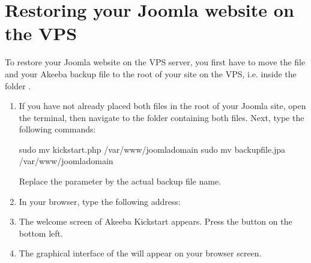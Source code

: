 \documentclass[a4paper,10pt,english,openany,oneside]{sphinxmanual}
\begin{document}
\section{Restoring your Joomla website on the VPS}
\label{\detokenize{joomla-to-vps:restoring-your-joomla-website-on-the-vps}}
\sphinxAtStartPar
To restore your Joomla website on the VPS server, you first have to move the file  and your Akeeba backup file  to the root of your site on the VPS, i.e. inside the folder .
\begin{enumerate}
%
\item {} 
\sphinxAtStartPar
If you have not already placed both files in the root of your Joomla site, open the terminal, then navigate to the folder containing both files. Next, type the following commands:

\begin{sphinxVerbatim}[commandchars=\\\{\},numbers=left,firstnumber=1,stepnumber=1]
\PYGZdl{} sudo mv kickstart.php /var/www/joomla\PYGZhy{}domain
\PYGZdl{} sudo mv backup\PYGZhy{}file.jpa /var/www/joomla\PYGZhy{}domain
\end{sphinxVerbatim}

\sphinxAtStartPar
Replace the parameter  by the actual backup file name.

\item {} 
\sphinxAtStartPar
In your browser, type the following address:

\sphinxAtStartPar
{}

\item {} 
\sphinxAtStartPar
The welcome screen of Akeeba Kickstart appears. Press the button  on the bottom left.

\begin{figure}[H]
\centering

\noindent{}
\end{figure}

\item {} 
\sphinxAtStartPar
The graphical interface of the  will appear on your browser screen.


\end{enumerate}
\end{document}
